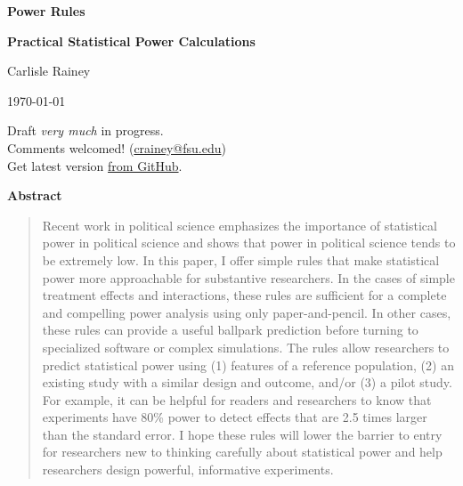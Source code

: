 \documentclass[12pt]{article}
\begin{document}
\begin{center}

{\huge \textbf{Power Rules}
}

\vspace{0.4cm}


{\Large\textbf{Practical Statistical Power Calculations}}



\vspace{1cm}

Carlisle Rainey

\vspace{1cm}
\today 
\vspace{5mm}

Draft \textit{very much} in progress. \\
Comments welcomed! (\href{mailto:crainey@fsu.edu}{crainey@fsu.edu}) \\\vspace{2mm}
Get latest version \href{https://github.com/carlislerainey/power-rules/blob/main/power-rules.pdf}{from GitHub}.
\end{center}

\vspace{5mm}

{\centerline{\textbf{Abstract}}}
\begin{quote}\noindent
Recent work in political science emphasizes the importance of statistical power in political science and shows that power in political science tends to be extremely low. 
In this paper, I offer simple rules that make statistical power more approachable for substantive researchers. 
In the cases of simple treatment effects and interactions, these rules are sufficient for a complete and compelling power analysis using only paper-and-pencil. 
In other cases, these rules can provide a useful ballpark prediction before turning to specialized software or complex simulations. 
The rules allow researchers to predict statistical power using (1) features of a reference population, (2) an existing study with a similar design and outcome, and/or (3) a pilot study. 
For example, it can be helpful for readers and researchers to know that experiments have 80\% power to detect effects that are 2.5 times larger than the standard error. 
I hope these rules will lower the barrier to entry for researchers new to thinking carefully about statistical power and help researchers design powerful, informative experiments.
\end{quote}
\end{document}
